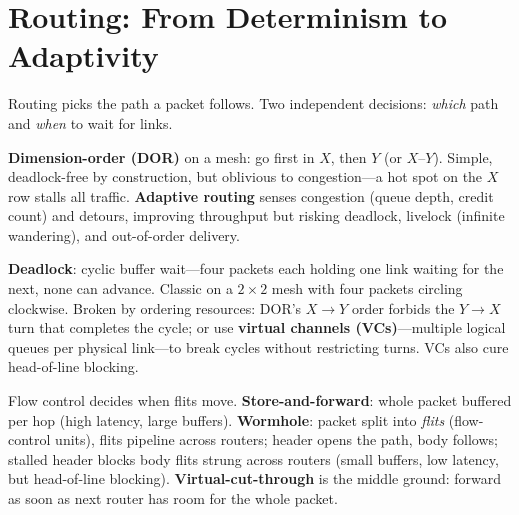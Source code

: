 \begin{center}
\end{center}

\section{Routing: From Determinism to Adaptivity}
Routing picks the path a packet follows. Two independent decisions: \emph{which} path
and \emph{when} to wait for links.

\textbf{Dimension-order (DOR)} on a mesh: go first in $X$, then $Y$ (or $X$--$Y$).
Simple, deadlock-free by construction, but oblivious to congestion---a hot spot on the
$X$ row stalls all traffic. \textbf{Adaptive routing} senses congestion (queue depth,
credit count) and detours, improving throughput but risking deadlock, livelock (infinite
wandering), and out-of-order delivery.

\textbf{Deadlock}: cyclic buffer wait---four packets each holding one link waiting for
the next, none can advance. Classic on a $2\times2$ mesh with four packets circling
clockwise. Broken by ordering resources: DOR's $X\to Y$ order forbids the $Y\to X$ turn
that completes the cycle; or use \textbf{virtual channels (VCs)}---multiple logical
queues per physical link---to break cycles without restricting turns. VCs also cure
head-of-line blocking.

Flow control decides when flits move. \textbf{Store-and-forward}: whole packet buffered
per hop (high latency, large buffers). \textbf{Wormhole}: packet split into \emph{flits}
(flow-control units), flits pipeline across routers; header opens the path, body
follows; stalled header blocks body flits strung across routers (small buffers, low
latency, but head-of-line blocking). \textbf{Virtual-cut-through} is the middle ground:
forward as soon as next router has room for the whole packet.

